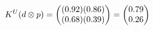 \documentclass[preview]{standalone}
\begin{document}
\begin{align*}
\special{dvisvgm:raw <g id='unique000'>}K^U(d \otimes p) = \begin{pmatrix} (0.92)(0.86) \\ (0.68)(0.39) \end{pmatrix} = \begin{pmatrix} 0.79 \\ 0.26 \end{pmatrix}\special{dvisvgm:raw </g>}
\end{align*}
\end{document}

